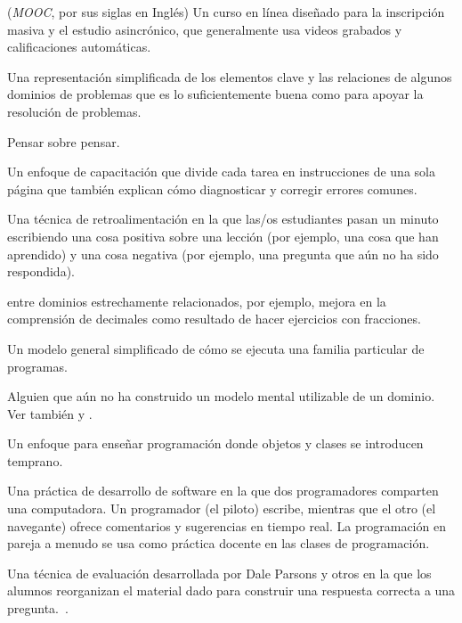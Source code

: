 \begin{description}
 (\emph{MOOC}, por sus siglas en Inglés) Un curso en línea diseñado para la inscripción masiva y el estudio asincrónico, que generalmente usa videos grabados y calificaciones automáticas.

 Una representación simplificada 
de los elementos clave y las relaciones de algunos dominios de problemas que es 
lo suficientemente buena como para apoyar la resolución de problemas.

 Pensar sobre pensar.

 Un enfoque de capacitación que divide 
cada tarea en instrucciones de una sola página que también 
explican cómo diagnosticar y corregir errores comunes.

 Una técnica de retroalimentación en la 
que las/os estudiantes pasan un minuto escribiendo una cosa positiva sobre una lección 
(por ejemplo, una cosa que han aprendido) y una cosa negativa (por ejemplo, una pregunta que aún no ha sido respondida).

  entre dominios estrechamente relacionados, por ejemplo, mejora en la comprensión de decimales como resultado de hacer ejercicios con fracciones.

 Un modelo general simplificado de cómo se ejecuta una familia particular de programas.

 Alguien que aún no ha construido un modelo mental utilizable de un dominio. Ver también  y .

 Un enfoque para enseñar programación donde 
objetos y clases se introducen temprano.

 Una práctica de desarrollo de software en la que dos programadores comparten una computadora. Un programador (el piloto) escribe, mientras que el otro (el navegante) ofrece comentarios y sugerencias en tiempo real. La programación en pareja a menudo se usa como práctica docente en las clases de programación.


 Una técnica de evaluación desarrollada 
por Dale Parsons y otros en la que los alumnos reorganizan el material dado 
para construir una respuesta correcta a una pregunta.~\cite{Pars2006}.




\end{description}
